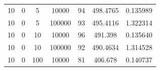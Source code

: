 \documentclass[11pt,a4paper]{report}
\begin{document}
\begin{table}[H]
{\begin{tabular}{c|c|c|c|c|c|c}
10                                                                                   & 0                                                                                      & 5                                                                          & 10000                                                                     & 94                                                                                        & 498.4765                                                                  & 0.135989              \\
10                                                                                   & 0                                                                                      & 5                                                                          & 100000                                                                    & 93                                                                                        & 495.4116                                                                  & 1.322314              \\ \hline
10                                                                                   & 0                                                                                      & 10                                                                         & 10000                                                                     & 96                                                                                        & 491.398                                                                   & 0.135640              \\
10                                                                                   & 0                                                                                      & 10                                                                         & 100000                                                                    & 92                                                                                        & 490.4634                                                                  & 1.314528              \\ \hline
10                                                                                   & 0                                                                                      & 100                                                                        & 10000                                                                     & 81                                                                                        & 406.678                                                                   & 0.140737              \\

\end{tabular}}
\end{table}
\end{document}

